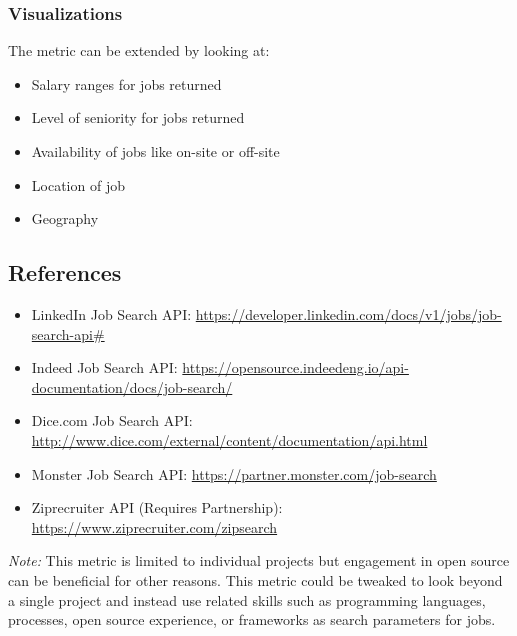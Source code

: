 \hypertarget{visualizations}{%
\subsubsection{Visualizations}\label{visualizations}}

The metric can be extended by looking at:

\begin{itemize}
\tightlist
\item
  Salary ranges for jobs returned
\item
  Level of seniority for jobs returned
\item
  Availability of jobs like on-site or off-site
\item
  Location of job
\item
  Geography
\end{itemize}

\hypertarget{references}{%
\subsection{References}\label{references}}

\begin{itemize}
\tightlist
\item
  LinkedIn Job Search API:
  \url{https://developer.linkedin.com/docs/v1/jobs/job-search-api\#}
\item
  Indeed Job Search API:
  \url{https://opensource.indeedeng.io/api-documentation/docs/job-search/}
\item
  Dice.com Job Search API:
  \url{http://www.dice.com/external/content/documentation/api.html}
\item
  Monster Job Search API: \url{https://partner.monster.com/job-search}
\item
  Ziprecruiter API (Requires Partnership):
  \url{https://www.ziprecruiter.com/zipsearch}
\end{itemize}

\emph{Note:} This metric is limited to individual projects but
engagement in open source can be beneficial for other reasons. This
metric could be tweaked to look beyond a single project and instead use
related skills such as programming languages, processes, open source
experience, or frameworks as search parameters for jobs.
